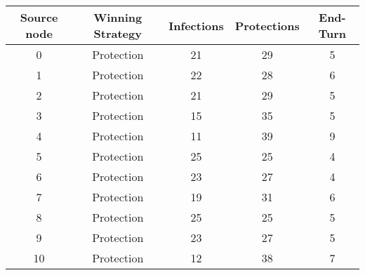 \documentclass[results.tex]{subfiles}
\begin{document}
    \begin{center}
        \begin{tabular}{| c || c | c | c | c |}
            \hline
            {\bfseries Source node} & {\bfseries Winning Strategy} & {\bfseries Infections} & {\bfseries Protections}
            & {\bfseries End-Turn}
            \\  %
            \hline\hline
            0                       & Protection                   & 21                     & 29                      & 5                    \\
            \hline
            1                       & Protection                   & 22                     & 28                      & 6                    \\
            \hline
            2                       & Protection                   & 21                     & 29                      & 5                    \\
            \hline
            3                       & Protection                   & 15                     & 35                      & 5                    \\
            \hline
            4                       & Protection                   & 11                     & 39                      & 9                    \\
            \hline
            5                       & Protection                   & 25                     & 25                      & 4                    \\
            \hline
            6                       & Protection                   & 23                     & 27                      & 4                    \\
            \hline
            7                       & Protection                   & 19                     & 31                      & 6                    \\
            \hline
            8                       & Protection                   & 25                     & 25                      & 5                    \\
            \hline
            9                       & Protection                   & 23                     & 27                      & 5                    \\
            \hline
            10                      & Protection                   & 12                     & 38                      & 7                    \\

\end{tabular}
\end{center}
\end{document}
